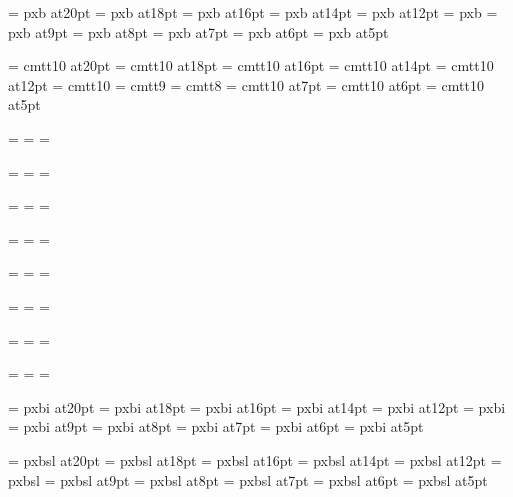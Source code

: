 \font\twentybf=     pxb at20pt
\font\eighteenbf=   pxb at18pt
\font\sixteenbf=    pxb at16pt
\font\fourteenbf=   pxb at14pt
\font\twelvebf=     pxb at12pt
\font\tenbf=        pxb
\font\ninebf=       pxb at9pt
\font\eightbf=      pxb at8pt
\font\sevenbf=      pxb at7pt
\font\sixbf=        pxb at6pt
\font\fivebf=       pxb at5pt

\font\twentytt=     cmtt10 at20pt
\font\eighteentt=   cmtt10 at18pt
\font\sixteentt=    cmtt10 at16pt
\font\fourteentt=   cmtt10 at14pt
\font\twelvett=     cmtt10 at12pt
\font\tentt=        cmtt10
\font\ninett=       cmtt9
\font\eighttt=      cmtt8
\font\seventt=      cmtt10 at7pt
\font\sixtt=        cmtt10 at6pt
\font\fivett=       cmtt10 at5pt




=\tenrm
{}=\sevenrm
{}=\fiverm
\def\rm{\fam=0 \tenrm}

=\teni
{}=\seveni
{}=\fivei
\def\mit{\fam=1}

=\tensy
{}=\sevensy
{}=\fivesy
\def\cal{\fam=2}

=\tenex
{}=\sevenex
{}=\fiveex


\def\it{\fam=\itfam \tenit}
\textfont\itfam=\tenit
\scriptfont\itfam=\sevenit
\scriptscriptfont\itfam=\fiveit

\def\sl{\fam=\slfam \tensl}
\textfont\slfam=\tensl
\scriptfont\slfam=\sevensl
\scriptscriptfont\slfam=\fivesl

\def\bf{\fam=\bffam \tenbf}
\textfont\bffam=\tenbf
\scriptfont\bffam=\sevenbf
\scriptscriptfont\bffam=\fivebf

\def\tt{\fam=\ttfam \tentt}
\textfont\ttfam=\tentt
\scriptfont\ttfam=\seventt
\scriptscriptfont\ttfam=\fivett

\font\twentyitbf=      pxbi at20pt
\font\eighteenitbf=    pxbi at18pt
\font\sixteenitbf=     pxbi at16pt
\font\fourteenitbf=    pxbi at14pt
\font\twelveitbf=      pxbi at12pt
\font\itbf=            pxbi
\font\nineitbf=        pxbi at9pt
\font\eightitbf=       pxbi at8pt
\font\sevenitbf=       pxbi at7pt
\font\sixitbf=         pxbi at6pt
\font\fiveitbf=        pxbi at5pt

\font\twentyslbf=      pxbsl at20pt
\font\eighteenslbf=    pxbsl at18pt
\font\sixteenslbf=     pxbsl at16pt
\font\fourteenslbf=    pxbsl at14pt
\font\twelveslbf=      pxbsl at12pt
\font\slbf=            pxbsl
\font\nineslbf=        pxbsl at9pt
\font\eightslbf=       pxbsl at8pt
\font\sevenslbf=       pxbsl at7pt
\font\sixslbf=         pxbsl at6pt
\font\fiveslbf=        pxbsl at5pt


